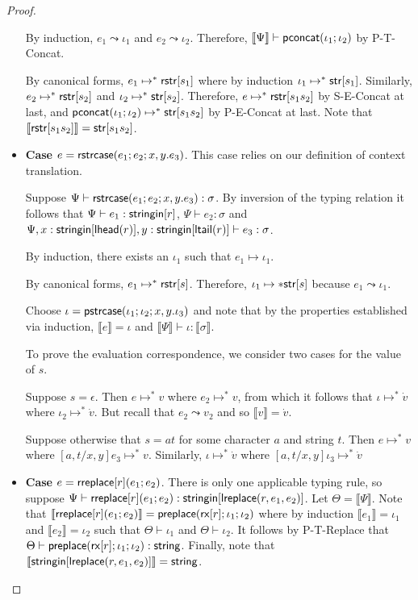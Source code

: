 \documentclass[11pt,leqno]{article}
\theoremstyle{definition}
\newcommand{\stringin}[1]{{\sf stringin}[#1]}
\renewcommand{\tstr}[1]{{{\sf str}[#1]}}
\newcommand{\treplace}[3]{{\sf preplace}(#1;#2;#3)}
\newcommand{\tconcat}[2]{{\sf pconcat}(#1;#2)} %
\newcommand{\rx}[1]{ {\sf rx}[#1] }
\newcommand{\str}{{\sf string}}
\newcommand{\lreplace}[3]{{\sf lreplace}(#1; #2; #3)}
\newcommand{\sctx}{\Psi} %
\newcommand{\tctx}{\Theta} %
\newcommand{\strcase}[3]{ {\sf rstrcase}(#1; #2; #3)}
\newcommand{\pstrcase}[3]{ {\sf pstrcase}(#1; #2; #3)}
\newcommand{\lhead}[1]{ {\sf lhead}(#1) }
\newcommand{\ltail}[1]{ {\sf ltail}(#1) }
\newcommand{\trden}[1]{\llbracket #1 \rrbracket} %
\renewcommand{\lreplace}[3]{{\sf lreplace}(#1, #2, #3)}
\begin{document}
\begin{proof}
\begin{itemize}[label=$ $, itemsep=1ex]
By induction, $e_1 \leadsto \iota_1$ and $e_2 \leadsto \iota_2$.
Therefore, $\trden{\sctx} \vdash \tconcat{\iota_1}{\iota_2}$ by P-T-Concat.

By canonical forms, $e_1 \mapsto^* {\sf rstr}[s_1]$ where by induction $\iota_1 \mapsto^* \tstr{s_1}$.
Similarly, $e_2 \mapsto^* {\sf rstr}[s_2]$ and $\iota_2 \mapsto^* \tstr{s_2}$.
Therefore, $e \mapsto^* {\sf rstr}[s_1s_2]$ by S-E-Concat at last, and $\tconcat{\iota_1}{\iota_2} \mapsto^* \tstr{s_1s_2}$ by P-E-Concat at last.
Note that $\trden{\rstr{s_1s_2}} = \tstr{s_1s_2}$.

\item \textbf{Case $e = \strcase{e_1}{e_2}{x,y.e_3}$}. This case relies on our definition
of context translation.

Suppose $\sctx \vdash \strcase{e_1}{e_2}{x,y.e_3} : \sigma$.
By inversion of the typing relation it follows that
$\sctx \vdash e_1 : \stringin{r}$, $\sctx \vdash e_2 : \sigma$ and $\sctx, x : \stringin{\lhead{r}}, y : \stringin{\ltail{r}} \vdash e_3 : \sigma$.

By induction, there exists an $\iota_1$ 
such that $e_1 \mapsto \iota_1$.

By canonical forms, $e_1 \mapsto^* {\sf rstr}[s]$. Therefore, $\iota_1 \mapsto* \tstr{s}$ because $e_1 \leadsto \iota_1$.

Choose $\iota = \pstrcase{\iota_1}{\iota_2}{x,y.\iota_3}$ and note that by the properties established via induction,
$\trden{e} = \iota$ and $\trden{\sctx} \vdash \iota : \trden{\sigma}$.

To prove the evaluation correspondence, we consider two cases for the value of $s$.

Suppose $s = \epsilon$. Then $e \mapsto^* v$ where $e_2 \mapsto^* v$,
from which it follows that 
$\iota \mapsto^* \dot{v}$ where $\iota_2 \mapsto^* \dot{v}$.
But recall that $e_2 \leadsto v_2$ and so $\trden{v} = \dot{v}$.

Suppose otherwise that $s = at$ for some character $a$ and string $t$.
Then $e \mapsto^* v$ where $[a, t / x, y] e_3 \mapsto^* v$.
Similarly, $\iota \mapsto^* \dot{v}$ where $[a, t / x, y] \iota_3 \mapsto^* \dot{v}$

\item \textbf{Case $e = {\sf rreplace}[r](e_1;e_2)$}.
There is only one applicable typing rule, so suppose
$\sctx \vdash \rreplace{r}{e_1}{e_2} : \stringin{\lreplace{r}{e_1}{e_2}}$.
Let $\tctx = \trden{\sctx}$.
Note that $\trden{\rreplace{r}{e_1}{e_2}} = \treplace{\rx{r}}{\iota_1}{\iota_2}$
where by induction $\trden{e_1} = \iota_1$ and $\trden{e_2} = \iota_2$
such that $\tctx \vdash \iota_1$ and $\tctx \vdash \iota_2$.
It follows by P-T-Replace that $\tctx \vdash \treplace{\rx{r}}{\iota_1}{\iota_2} : \str$.
Finally, note that $\trden{\stringin{\lreplace{r}{e_1}{e_2}}} = \str$.


\end{itemize}
\end{proof}
\end{document}

